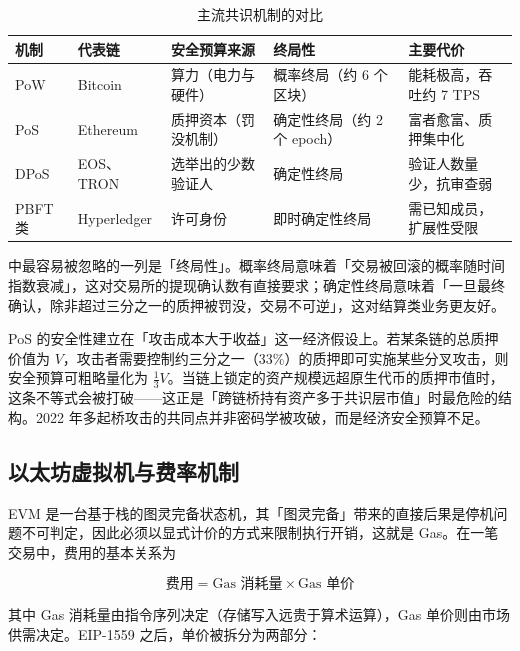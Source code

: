 \begin{table}[htbp]
\centering
\caption{主流共识机制的对比}\label{tab:03-consensus}
\tablefont
\begin{tabular}{@{}p{1.7cm}p{2.9cm}p{2.4cm}p{2.3cm}L{4.6cm}@{}}
\toprule
机制 & 代表链 & 安全预算来源 & 终局性 & 主要代价 \\
\midrule
PoW & Bitcoin & 算力（电力与硬件） & 概率终局（约 6 个区块） & 能耗极高，吞吐约 7 TPS \\
PoS & Ethereum & 质押资本（罚没机制） & 确定性终局（约 2 个 epoch） & 富者愈富、质押集中化 \\
DPoS & EOS、TRON & 选举出的少数验证人 & 确定性终局 & 验证人数量少，抗审查弱 \\
PBFT 类 & Hyperledger & 许可身份 & 即时确定性终局 & 需已知成员，扩展性受限 \\
\bottomrule
\end{tabular}
\end{table}

中最容易被忽略的一列是「终局性」。概率终局意味着「交易被回滚的概率随时间指数衰减」，这对交易所的提现确认数有直接要求；确定性终局意味着「一旦最终确认，除非超过三分之一的质押被罚没，交易不可逆」，这对结算类业务更友好。

\begin{warningbox}[终局性与经济安全预算]
PoS 的安全性建立在「攻击成本大于收益」这一经济假设上。若某条链的总质押价值为 $V$，攻击者需要控制约三分之一（33\%）的质押即可实施某些分叉攻击，则安全预算可粗略量化为 $\tfrac13 V$。当链上锁定的资产规模远超原生代币的质押市值时，这条不等式会被打破——这正是「跨链桥持有资产多于共识层市值」时最危险的结构。2022 年多起桥攻击的共同点并非密码学被攻破，而是经济安全预算不足。
\end{warningbox}

\subsection{以太坊虚拟机与费率机制}

EVM 是一台基于栈的图灵完备状态机，其「图灵完备」带来的直接后果是停机问题不可判定，因此必须以显式计价的方式来限制执行开销，这就是 Gas。在一笔交易中，费用的基本关系为

\begin{equation}
  \text{费用} = \text{Gas 消耗量} \times \text{Gas 单价}
  \label{eq:03-gasfee}
\end{equation}

其中 Gas 消耗量由指令序列决定（存储写入远贵于算术运算），Gas 单价则由市场供需决定。EIP-1559 之后，单价被拆分为两部分：

